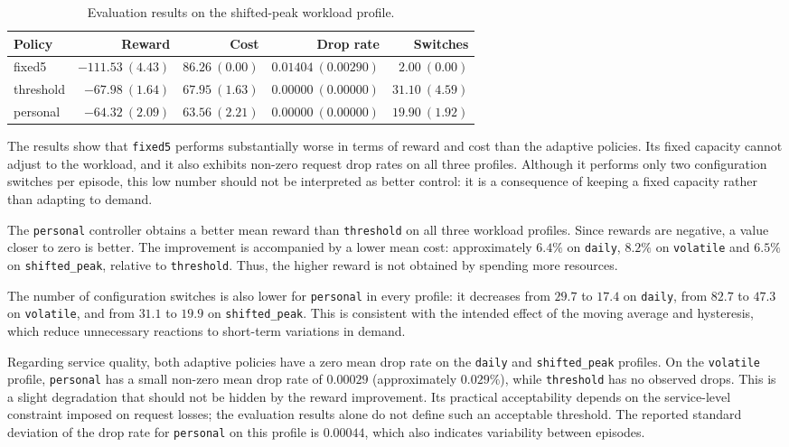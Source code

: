 \documentclass[a4paper,11pt]{article}
\begin{document}
\begin{table}[H]
    \centering
    \small
    \begin{tabular}{lrrrr}
        \toprule
        \textbf{Policy} &
        \textbf{Reward} &
        \textbf{Cost} &
        \textbf{Drop rate} &
        \textbf{Switches} \\
        \midrule
        fixed5 &
        $-111.53 \ (4.43)$ &
        $86.26 \ (0.00)$ &
        $0.01404 \ (0.00290)$ &
        $2.00 \ (0.00)$ \\
        threshold &
        $-67.98 \ (1.64)$ &
        $67.95 \ (1.63)$ &
        $0.00000 \ (0.00000)$ &
        $31.10 \ (4.59)$ \\
        personal &
        $\mathbf{-64.32} \ (2.09)$ &
        $\mathbf{63.56} \ (2.21)$ &
        $0.00000 \ (0.00000)$ &
        $\mathbf{19.90} \ (1.92)$ \\
        \bottomrule
    \end{tabular}
    \caption{Evaluation results on the shifted-peak workload profile.}
    \label{tab:shifted_peak_baselines}
\end{table}

The results show that \texttt{fixed5} performs substantially worse in terms
of reward and cost than the adaptive policies. Its fixed capacity cannot
adjust to the workload, and it also exhibits non-zero request drop rates
on all three profiles. Although it performs only two configuration switches
per episode, this low number should not be interpreted as better control:
it is a consequence of keeping a fixed capacity rather than adapting to
demand.

The \texttt{personal} controller obtains a better mean reward than
\texttt{threshold} on all three workload profiles. Since rewards are
negative, a value closer to zero is better. The improvement is accompanied
by a lower mean cost: approximately $6.4\%$ on \texttt{daily},
$8.2\%$ on \texttt{volatile} and $6.5\%$ on \texttt{shifted\_peak},
relative to \texttt{threshold}. Thus, the higher reward is not obtained
by spending more resources.

The number of configuration switches is also lower for
\texttt{personal} in every profile: it decreases from $29.7$ to $17.4$
on \texttt{daily}, from $82.7$ to $47.3$ on \texttt{volatile}, and from
$31.1$ to $19.9$ on \texttt{shifted\_peak}. This is consistent with the
intended effect of the moving average and hysteresis, which reduce
unnecessary reactions to short-term variations in demand.

Regarding service quality, both adaptive policies have a zero mean drop
rate on the \texttt{daily} and \texttt{shifted\_peak} profiles. On the
\texttt{volatile} profile, \texttt{personal} has a small non-zero mean
drop rate of $0.00029$ (approximately $0.029\%$), while
\texttt{threshold} has no observed drops. This is a slight degradation
that should not be hidden by the reward improvement. Its practical
acceptability depends on the service-level constraint imposed on request
losses; the evaluation results alone do not define such an acceptable
threshold. The reported standard deviation of the drop rate for
\texttt{personal} on this profile is $0.00044$, which also indicates
variability between episodes.
\end{document}

